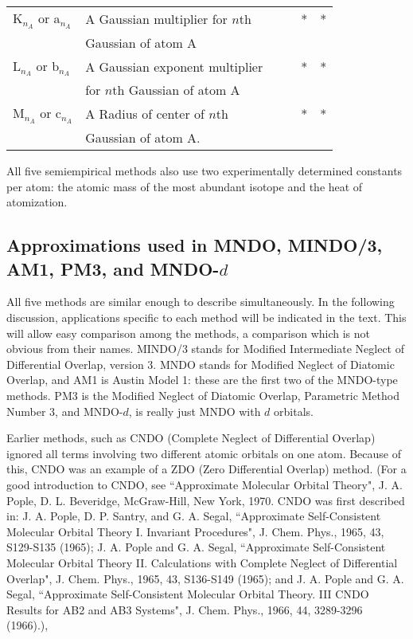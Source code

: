 \documentclass[a4paper]{book}
\begin{document}
\begin{table}
\begin{center}
\begin{tabular}{|l|l|cccc|}
K$_{n_A}$ or a$_{n_A}$ & A Gaussian multiplier for $n$th &  &&  *  &*  \\
&  Gaussian of atom A &&&& \\
L$_{n_A}$ or b$_{n_A}$ & A Gaussian exponent multiplier&   &&  * & *  \\
&  for $n$th Gaussian of atom A &&&& \\
M$_{n_A}$ or c$_{n_A}$ & A Radius of center of $n$th  && &   * & *  \\
&  Gaussian of atom A. &&&& \\ \hline
\end{tabular}
\end{center}
\end{table}

All five semiempirical methods also use two experimentally determined constants
per atom: the atomic mass of the most abundant isotope and the heat of
atomization.

\subsection{Approximations used in MNDO, MINDO/3, AM1, PM3, and MNDO-$d$}
All five methods are similar enough to describe simultaneously. In the
following discussion, applications specific to each method will be indicated in
the text. This will allow easy comparison among the methods, a comparison which
is not obvious from their names. MINDO/3 stands for Modified Intermediate
Neglect of Differential Overlap, version 3. MNDO stands for Modified Neglect of
Diatomic Overlap, and AM1 is Austin Model 1: these are the first two of  the
MNDO-type methods. PM3 is the Modified Neglect of Diatomic Overlap, Parametric
Method Number 3, and MNDO-$d$, is really just MNDO with $d$ orbitals.

Earlier methods, such as CNDO  (Complete Neglect of Differential Overlap) ignored all
terms involving two different atomic orbitals on one atom. Because of this, CNDO
was an example of a ZDO  (Zero Differential Overlap) method. (For a good
introduction to CNDO, see ``Approximate Molecular Orbital Theory", J. A. Pople,
D. L. Beveridge, McGraw-Hill, New York, 1970. CNDO was first described in: 
J. A. Pople, D. P. Santry, and G. A. Segal, ``Approximate Self-Consistent
Molecular Orbital Theory I. Invariant Procedures", J. Chem. Phys., 1965, 43,
S129-S135 (1965); J. A. Pople and G. A. Segal, ``Approximate Self-Consistent
Molecular Orbital Theory II. Calculations with Complete Neglect of Differential
 Overlap", J. Chem. Phys., 1965, 43, S136-S149 (1965); and J. A. Pople and
 G. A. Segal, ``Approximate Self-Consistent Molecular Orbital Theory. III CNDO
 Results for AB2 and AB3 Systems", J. Chem. Phys., 1966, 44, 3289-3296 (1966).),
\end{document}
